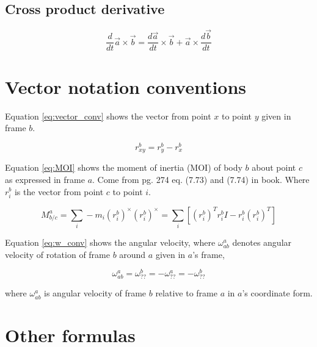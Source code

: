 \subsection{Cross product derivative}

\begin{equation}
    \frac{d}{dt} \Vec{a} \times \Vec{b} = \frac{d\Vec{a}}{dt} \times \Vec{b} + \Vec{a} \times \frac{d\Vec{b}}{dt}
\end{equation}

\section{Vector notation conventions}

Equation \ref{eq:vector_conv} shows the vector from point $x$ to point $y$ given in frame $b$.

\begin{equation}
\label{eq:vector_conv}
    r^b_{xy} = r^b_y - r^b_x
\end{equation} 

Equation \ref{eq:MOI} shows the moment of inertia (MOI) of body $b$ about point $c$ as expressed in frame $a$. Come from pg. 274 eq. (7.73) and (7.74) in book. Where $r^b_i$ is the vector from point $c$ to point $i$.

\begin{equation}
\label{eq:MOI}
    M^a_{b/c} = \sum\limits_{i} -m_i(r^b_i)^\times(r^b_i)^\times = \sum\limits_{i}[(r^b_i)^Tr^b_iI-r^b_i(r^b_i)^T]
\end{equation} 

Equation \ref{eq:w_conv} shows the angular velocity, where $\omega^a_{ab}$ denotes angular velocity of rotation of frame $b$ around $a$ given in $a$'s frame,

\begin{equation}
\label{eq:w_conv}
    \omega^a_{ab} = \omega^b_{??} = -\omega^a_{??} = -\omega^b_{??}
\end{equation} 


where $\omega^a_{ab}$ is angular velocity of frame $b$ relative to frame $a$ in $a$'s coordinate form.

\section{Other formulas}

